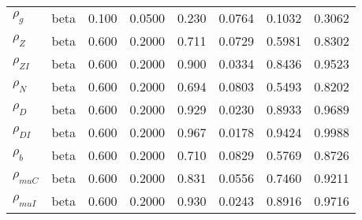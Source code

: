 \begin{center}
\begin{longtable}{llcccccc}
${\rho_g}$ & beta &   0.100 & 0.0500 &   0.230& 0.0764 &  0.1032 &  0.3062 \\ 
${\rho_Z}$ & beta &   0.600 & 0.2000 &   0.711& 0.0729 &  0.5981 &  0.8302 \\ 
${\rho_{ZI}}$ & beta &   0.600 & 0.2000 &   0.900& 0.0334 &  0.8436 &  0.9523 \\ 
${\rho_N}$ & beta &   0.600 & 0.2000 &   0.694& 0.0803 &  0.5493 &  0.8202 \\ 
${\rho_D}$ & beta &   0.600 & 0.2000 &   0.929& 0.0230 &  0.8933 &  0.9689 \\ 
${\rho_{DI}}$ & beta &   0.600 & 0.2000 &   0.967& 0.0178 &  0.9424 &  0.9988 \\ 
${\rho_b}$ & beta &   0.600 & 0.2000 &   0.710& 0.0829 &  0.5769 &  0.8726 \\ 
${\rho_{muC}}$ & beta &   0.600 & 0.2000 &   0.831& 0.0556 &  0.7460 &  0.9211 \\ 
${\rho_{muI}}$ & beta &   0.600 & 0.2000 &   0.930& 0.0243 &  0.8916 &  0.9716 \\ 
\end{longtable}
 \end{center}
